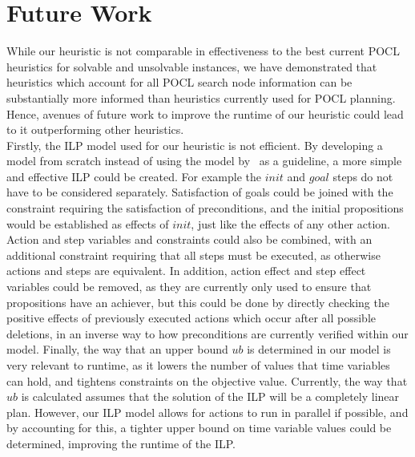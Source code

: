 \chapter{Future Work}\label{chap:futureWork}

While our heuristic is not comparable in effectiveness to the best current POCL heuristics for solvable and unsolvable instances, we have demonstrated that heuristics which account for all POCL search node information can be substantially more informed than heuristics currently used for POCL planning. Hence, avenues of future work to improve the runtime of our heuristic could lead to it outperforming other heuristics.\\


Firstly, the ILP model used for our heuristic is not efficient. By developing a model from scratch instead of using the model by~\cite{Imai2015ILPDeleteRelaxedPlanning} as a guideline, a more simple and effective ILP could be created. For example the $\mathit{init}$ and $\mathit{goal}$ steps do not have to be considered separately. Satisfaction of goals could be joined with the constraint requiring the satisfaction of preconditions, and the initial propositions would be established as effects of $\mathit{init}$, just like the effects of any other action. Action and step variables and constraints could also be combined, with an additional constraint requiring that all steps must be executed, as otherwise actions and steps are equivalent. In addition, action effect and step effect variables could be removed, as they are currently only used to ensure that propositions have an achiever, but this could be done by directly checking the positive effects of previously executed actions which occur after all possible deletions, in an inverse way to how preconditions are currently verified within our model. Finally, the way that an upper bound $ub$ is determined in our model is very relevant to runtime, as it lowers the number of values that time variables can hold, and tightens constraints on the objective value. Currently, the way that $ub$ is calculated assumes that the solution of the ILP will be a completely linear plan. However, our ILP model allows for actions to run in parallel if possible, and by accounting for this, a tighter upper bound on time variable values could be determined, improving the runtime of the ILP.\\


